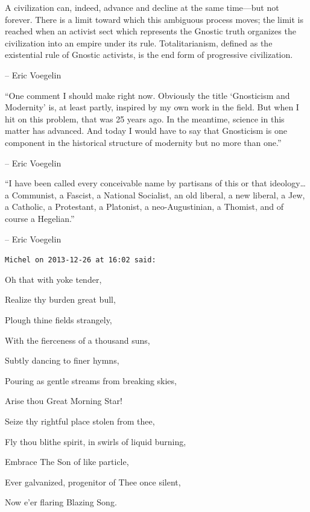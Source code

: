 \begin{footnotesize}
\begin{sffamily}
\begin{quotationx}
A civilization can, indeed, advance and decline at the same time—but not forever. There is a limit
toward which this ambiguous process moves; the limit is reached when an activist sect which represents the Gnostic
truth organizes the civilization into an empire under its rule. Totalitarianism, defined as the existential rule of
Gnostic activists, is the end form of progressive civilization.

– Eric Voegelin

\hfill

“One comment I should make right now. Obviously the title `Gnosticism and
Modernity' is, at least partly, inspired by my own work in the field. But when I hit on this
problem, that was 25 years ago. In the meantime, science in this matter has advanced. And today I would have to say
that Gnosticism is one component in the historical structure of modernity but no more than one.”

– Eric Voegelin

\hfill

“I have been called every conceivable name by partisans of this or that ideology… a Communist, a Fascist, a National
Socialist, an old liberal, a new liberal, a Jew, a Catholic, a Protestant, a Platonist, a neo-Augustinian, a Thomist,
and of course a Hegelian.”

– Eric Voegelin

\end{quotationx}

\hfill

\texttt{Michel on 2013-12-26 at 16:02 said: }
\begin{flushleft}
Oh that with yoke tender,

Realize thy burden great bull,

Plough thine fields strangely,

With the fierceness of a thousand suns,

Subtly dancing to finer hymns,

Pouring as gentle streams from breaking skies,

Arise thou Great Morning Star!

Seize thy rightful place stolen from thee,

Fly thou blithe spirit, in swirls of liquid burning,

Embrace The Son of like particle,

Ever galvanized, progenitor of Thee once silent,

Now e'er flaring Blazing Song.
\end{flushleft}


\end{sffamily}
\end{footnotesize}
